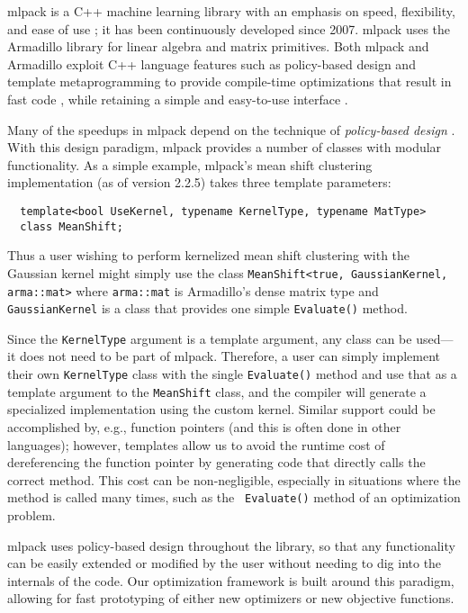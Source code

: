 \documentclass{article}
\begin{document}
mlpack is a C++ machine learning library with an emphasis on speed, flexibility,
and ease of use \cite{mlpack2013}; it has been continuously developed since
2007.  mlpack uses the Armadillo library \cite{pasc2017} for
linear algebra and matrix primitives.  Both mlpack and Armadillo exploit C++
language features such as policy-based design and template metaprogramming to
provide compile-time optimizations that result in fast code \cite{pasc2017},
while retaining a simple and easy-to-use interface \cite{icopust2017}.

Many of the speedups in mlpack depend on the technique of {\it policy-based
design} \cite{Alexandrescu2001}.  With this design paradigm, mlpack
provides a number of classes with modular functionality.  As a simple example,
mlpack's mean shift clustering implementation (as of version 2.2.5) takes three
template parameters:

\vspace*{-0.4em}
\begin{verbatim}
  template<bool UseKernel, typename KernelType, typename MatType>
  class MeanShift;
\end{verbatim}
\vspace*{-0.4em}

Thus a user wishing to perform kernelized mean shift clustering with the
Gaussian kernel might simply use the class
{\footnotesize \texttt{MeanShift<true, GaussianKernel, arma::mat>}}
\noindent where {\tt arma::mat} is Armadillo's dense matrix type and {\tt
GaussianKernel} is a class that provides one simple {\tt Evaluate()} method.

Since the {\tt KernelType} argument is a template argument, any class can be
used---it does not need to be part of mlpack.  Therefore, a user can simply
implement their own {\tt KernelType} class with the single {\tt Evaluate()}
method and use that as a template argument to the {\tt MeanShift} class, and
the compiler will generate a specialized implementation using the custom
kernel.  Similar support could be accomplished by, e.g., function pointers (and
this is often done in other languages); however, templates allow us to avoid
the runtime cost of dereferencing the function pointer by generating code that
directly calls the correct method. This cost can be non-negligible, especially
in situations where the method is called many times, such as the {\tt
Evaluate()} method of an optimization problem.

mlpack uses policy-based design throughout the library, so that any
functionality can be easily extended or modified by the user without needing to
dig into the internals of the code.  Our optimization framework is built around
this paradigm, allowing for fast prototyping of either new optimizers or new
objective functions.
\end{document}
